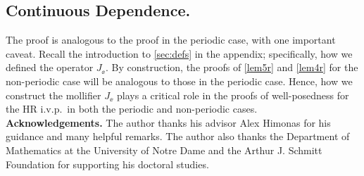 \subsection{Continuous Dependence.} The proof is analogous to the proof in
the periodic case, with one important caveat. Recall the introduction to \cref{sec:defs} in the appendix; specifically, how we defined the operator
$J_\ee$. By construction, the proofs of \cref{lem5r} and \cref{lem4r} for the non-periodic case will be
analogous to those in the periodic case. Hence, how we
construct the mollifier $J_\ee$ plays a critical role in the proofs of
well-posedness for the HR i.v.p.\ in both the periodic and non-periodic cases. %
%
\\
\textbf{Acknowledgements.} The author thanks his advisor Alex Himonas for 
his guidance and many helpful remarks. The author also thanks the Department of 
Mathematics at the University of Notre Dame and the Arthur J. Schmitt Foundation for 
supporting his doctoral 
studies.
%
%
%
